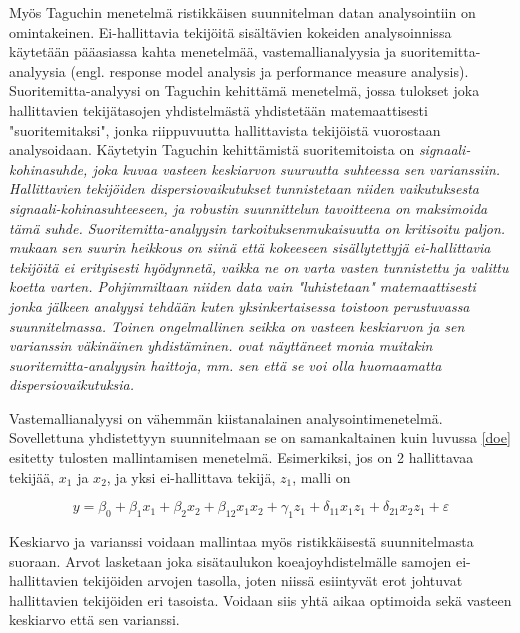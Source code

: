 \documentclass[12pt,a4paper,finnish]{tutthesis}
\begin{document}
Myös Taguchin menetelmä ristikkäisen suunnitelman datan analysointiin on
omintakeinen. Ei-hallittavia tekijöitä sisältävien kokeiden analysoinnissa
käytetään pääasiassa kahta menetelmää, vastemallianalyysia ja suoritemitta-analyysia
(engl. response model analysis ja performance measure analysis).
Suoritemitta-analyysi on Taguchin kehittämä menetelmä, jossa
tulokset joka hallittavien tekijätasojen yhdistelmästä yhdistetään matemaattisesti
"suoritemitaksi", jonka riippuvuutta hallittavista tekijöistä vuorostaan
analysoidaan. Käytetyin Taguchin kehittämistä suoritemitoista on
\em signaali-kohinasuhde, \em joka kuvaa vasteen keskiarvon suuruutta suhteessa
sen varianssiin. Hallittavien tekijöiden dispersiovaikutukset tunnistetaan
niiden vaikutuksesta signaali-kohinasuhteeseen, ja robustin suunnittelun
tavoitteena on maksimoida tämä suhde.
Suoritemitta-analyysin tarkoituksenmukaisuutta on kritisoitu paljon.
\textcite{Bursztyn} mukaan sen suurin heikkous on siinä että
kokeeseen sisällytettyjä ei-hallittavia tekijöitä ei
erityisesti hyödynnetä,
vaikka ne on varta vasten tunnistettu ja valittu koetta varten. Pohjimmiltaan
niiden data vain "luhistetaan" matemaattisesti jonka jälkeen analyysi
tehdään kuten yksinkertaisessa toistoon perustuvassa suunnitelmassa.
Toinen ongelmallinen seikka on vasteen keskiarvon ja sen varianssin
väkinäinen yhdistäminen.
\textcite{box1988,steinberg1994} ovat näyttäneet monia muitakin suoritemitta-analyysin
haittoja, mm. sen että se voi olla huomaamatta dispersiovaikutuksia.

Vastemallianalyysi on vähemmän kiistanalainen analysointimenetelmä.
Sovellettuna yhdistettyyn suunnitelmaan se on samankaltainen kuin
luvussa \ref{doe} esitetty tulosten mallintamisen
menetelmä. Esimerkiksi, jos on 2 hallittavaa tekijää, $x_1$ ja $x_2$, ja yksi
ei-hallittava tekijä, $z_1$, malli on

\begin{equation}
  \label{eq:vastemalli}
 y = \beta _0 + \beta _{1}x_1 + \beta _{2}x_2 + \beta _{12}x_{1}x_{2} + \gamma _{1}z_1 + \delta _{11}x_{1}z_{1} + \delta _{21}x_{2}z_1 + \varepsilon
\end{equation}

Keskiarvo ja varianssi voidaan mallintaa myös ristikkäisestä suunnitelmasta suoraan.
Arvot lasketaan joka sisätaulukon koeajoyhdistelmälle
samojen ei-hallittavien tekijöiden arvojen tasolla,
joten niissä esiintyvät erot johtuvat hallittavien tekijöiden eri tasoista. Voidaan
siis yhtä aikaa optimoida sekä vasteen keskiarvo että sen varianssi.
\end{document}
